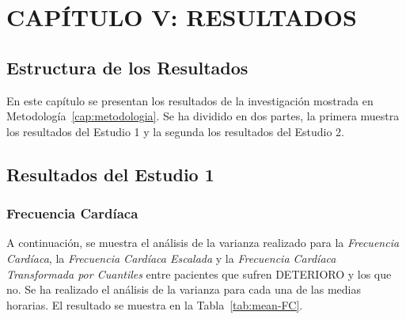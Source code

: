 \section{CAPÍTULO V: RESULTADOS}\label{cap:results}

\subsection{Estructura de los Resultados}\label{sec:results}

En este capítulo se presentan los resultados de la investigación mostrada en Metodología~\ref{cap:metodologia}. Se ha dividido en dos partes, la primera muestra los resultados del Estudio 1 y la segunda los resultados del Estudio 2.

\subsection{Resultados del Estudio 1}\label{sec:resultados-estudio-1}

\subsubsection{Frecuencia Cardíaca}

A continuación, se muestra el análisis de la varianza realizado para la \textit{Frecuencia Cardíaca}, la \textit{Frecuencia Cardíaca Escalada} y la \textit{Frecuencia Cardíaca Transformada por Cuantiles} entre pacientes que sufren DETERIORO y los que no. Se ha realizado el análisis de la varianza para cada una de las medias horarias. El resultado se muestra en la Tabla~\ref{tab:mean-FC}.  


